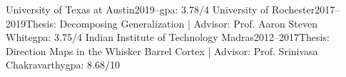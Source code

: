     {University of Texas at Austin}{2019--}{}{\rmsc gpa: 3.78/4}
    {University of Rochester}{2017--2019}{Thesis: Decomposing Generalization | Advisor: Prof. Aaron Steven White}{\rmsc gpa: 3.75/4}
    {Indian Institute of Technology Madras}{2012--2017}{Thesis: Direction Maps in the Whisker Barrel Cortex | Advisor: Prof. Srinivasa Chakravarthy}{\rmsc gpa: 8.68/10}
